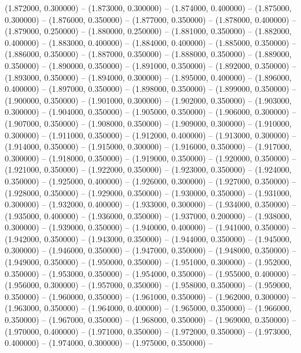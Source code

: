 (1.872000, 0.300000) -- 
(1.873000, 0.300000) -- 
(1.874000, 0.400000) -- 
(1.875000, 0.300000) -- 
(1.876000, 0.350000) -- 
(1.877000, 0.350000) -- 
(1.878000, 0.400000) -- 
(1.879000, 0.250000) -- 
(1.880000, 0.250000) -- 
(1.881000, 0.350000) -- 
(1.882000, 0.400000) -- 
(1.883000, 0.400000) -- 
(1.884000, 0.400000) -- 
(1.885000, 0.350000) -- 
(1.886000, 0.350000) -- 
(1.887000, 0.350000) -- 
(1.888000, 0.350000) -- 
(1.889000, 0.350000) -- 
(1.890000, 0.350000) -- 
(1.891000, 0.350000) -- 
(1.892000, 0.350000) -- 
(1.893000, 0.350000) -- 
(1.894000, 0.300000) -- 
(1.895000, 0.400000) -- 
(1.896000, 0.400000) -- 
(1.897000, 0.350000) -- 
(1.898000, 0.350000) -- 
(1.899000, 0.350000) -- 
(1.900000, 0.350000) -- 
(1.901000, 0.300000) -- 
(1.902000, 0.350000) -- 
(1.903000, 0.300000) -- 
(1.904000, 0.350000) -- 
(1.905000, 0.350000) -- 
(1.906000, 0.300000) -- 
(1.907000, 0.350000) -- 
(1.908000, 0.350000) -- 
(1.909000, 0.300000) -- 
(1.910000, 0.300000) -- 
(1.911000, 0.350000) -- 
(1.912000, 0.400000) -- 
(1.913000, 0.300000) -- 
(1.914000, 0.350000) -- 
(1.915000, 0.300000) -- 
(1.916000, 0.350000) -- 
(1.917000, 0.300000) -- 
(1.918000, 0.350000) -- 
(1.919000, 0.350000) -- 
(1.920000, 0.350000) -- 
(1.921000, 0.350000) -- 
(1.922000, 0.350000) -- 
(1.923000, 0.350000) -- 
(1.924000, 0.350000) -- 
(1.925000, 0.400000) -- 
(1.926000, 0.300000) -- 
(1.927000, 0.350000) -- 
(1.928000, 0.350000) -- 
(1.929000, 0.350000) -- 
(1.930000, 0.350000) -- 
(1.931000, 0.300000) -- 
(1.932000, 0.400000) -- 
(1.933000, 0.300000) -- 
(1.934000, 0.350000) -- 
(1.935000, 0.400000) -- 
(1.936000, 0.350000) -- 
(1.937000, 0.200000) -- 
(1.938000, 0.300000) -- 
(1.939000, 0.350000) -- 
(1.940000, 0.400000) -- 
(1.941000, 0.350000) -- 
(1.942000, 0.350000) -- 
(1.943000, 0.350000) -- 
(1.944000, 0.350000) -- 
(1.945000, 0.300000) -- 
(1.946000, 0.350000) -- 
(1.947000, 0.350000) -- 
(1.948000, 0.350000) -- 
(1.949000, 0.350000) -- 
(1.950000, 0.350000) -- 
(1.951000, 0.300000) -- 
(1.952000, 0.350000) -- 
(1.953000, 0.350000) -- 
(1.954000, 0.350000) -- 
(1.955000, 0.400000) -- 
(1.956000, 0.300000) -- 
(1.957000, 0.350000) -- 
(1.958000, 0.350000) -- 
(1.959000, 0.350000) -- 
(1.960000, 0.350000) -- 
(1.961000, 0.350000) -- 
(1.962000, 0.300000) -- 
(1.963000, 0.350000) -- 
(1.964000, 0.400000) -- 
(1.965000, 0.350000) -- 
(1.966000, 0.350000) -- 
(1.967000, 0.350000) -- 
(1.968000, 0.350000) -- 
(1.969000, 0.350000) -- 
(1.970000, 0.400000) -- 
(1.971000, 0.350000) -- 
(1.972000, 0.350000) -- 
(1.973000, 0.400000) -- 
(1.974000, 0.300000) -- 
(1.975000, 0.350000) -- 
